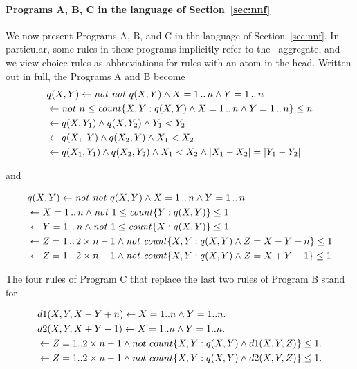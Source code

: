 \documentclass{article}
\begin{document}
\paragraph{Programs A, B, C in the language of Section~\ref{sec:nnf}}
We now present Programs A, B, and C in the language of Section~\ref{sec:nnf}.
In particular,
some rules in these programs implicitly refer to the \co\ aggregate, and
we view choice rules as abbreviations for rules with an atom in
the head.  Written out in full, the Programs A and B become
\begin{align}
& q(X,Y) \leftarrow \mathit{not}\   \mathit{not}\   q(X,Y) \land X = 1\,..\,n \land Y = 1\,..\,n	\label{a1}\\
& \leftarrow \mathit{not}\ n\leq  \mathit{count}\{ X,Y : q(X,Y) \land X = 1\,..\,n \land Y = 1\,..\,n \}
  \leq n
  \label{a2}\\
& \leftarrow q(X,Y_1) \land q(X,Y_2) \land Y_1 < Y_2\label{a3}\\
& \leftarrow q(X_1,Y) \land q(X_2,Y) \land X_1 < X_2\label{a4}\\
& \leftarrow q(X_1,Y_1) \land q(X_2,Y_2) \land X_1 < X_2 \land |X_1-X_2| = |Y_1-Y_2|
  \label{a5}
\end{align}

\noindent and

\begin{align}
& q(X,Y) \leftarrow \mathit{not}\   \mathit{not}\   q(X,Y) \land X = 1\,..\,n \land Y = 1\,..\,n\label{b1}\\
& \leftarrow X = 1\,..\,n \land \mathit{not}\ 1\leq \mathit{count}\{ Y : q(X,Y) \} \leq 1\label{b2}\\
& \leftarrow Y = 1\,..\,n \land \mathit{not}\ 1\leq \mathit{count}\{ X : q(X,Y) \} \leq 1\label{b3}\\
& \leftarrow Z = 1\,..\,2\times n-1
  \land \mathit{not}\   \mathit{count}\{ X,Y : q(X,Y) \land Z = X-Y+n \} \leq  1
  \label{b4}\\
& \leftarrow Z = 1\,..\,2\times n-1
  \land \mathit{not}\   \mathit{count}\{ X,Y : q(X,Y) \land Z = X+Y-1 \} \leq  1
  \label{b5}
\end{align}

The four rules of Program C that replace the last two rules of Program B stand for

\begin{align}
&d1(X,Y,X-Y+n) \leftarrow X = 1..n\wedge  Y = 1..n.\label{c4}\\
&d2(X,Y,X+Y-1) \leftarrow X = 1..n\wedge Y = 1..n.\label{c5}\\
&\leftarrow Z = 1..2\times n-1\wedge not\ count \{ X,Y: q(X,Y) \wedge d1(X,Y,Z) \} \leq 1.\label{c6}\\
&\leftarrow Z = 1..2\times n-1\wedge not\ count   \{X,Y:  q(X,Y) \wedge d2(X,Y,Z) \} \leq 1.\label{c7}    
\end{align}
\end{document}
